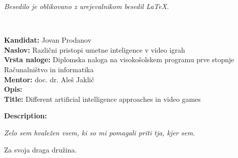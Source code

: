 \documentclass[a4paper, 12pt]{book}
\newcommand{\ttitle}{Različni pristopi umetne inteligence v video igrah}
\newcommand{\ttitleEn}{Different artificial intelligence approaches in video games}
\newcommand{\tauthor}{Jovan Prodanov}
\newcommand{\clearemptydoublepage}{\newpage{\pagestyle{empty}\cleardoublepage}}
\begin{document}
\begin{center}
\mbox{}\vfill
\emph{Besedilo je oblikovano z urejevalnikom besedil \LaTeX.}
\end{center}

\clearemptydoublepage

\thispagestyle{empty}
\
\vfill

\bigskip
\noindent\textbf{Kandidat:} \tauthor\\
\noindent\textbf{Naslov:} \ttitle\\
\noindent\textbf{Vrsta naloge:} Diplomska naloga na visokošolskem programu prve stopnje Računalništvo in informatika \\
\noindent\textbf{Mentor:} doc. dr. Aleš Jaklič\\

\bigskip
\noindent\textbf{Opis:}\\

\bigskip
\noindent\textbf{Title:} \ttitleEn

\bigskip
\noindent\textbf{Description:}\\


\vfill

\vspace{2cm}

\clearemptydoublepage

\thispagestyle{empty}\mbox{}\vfill\null\it%
\noindent
Zelo sem hvaležen vsem, ki so mi pomagali priti tja, kjer sem.
\rm\normalfont

\clearemptydoublepage


\thispagestyle{empty}\mbox{}{\textheight}\mbox{}\hfill\begin{minipage}{0.55\textwidth}%
Za svoja draga družina.
\normalfont\end{minipage}

\clearemptydoublepage


\pagestyle{empty}
\def\thepage{}%
\tableofcontents{}


\clearemptydoublepage


\end{document}
